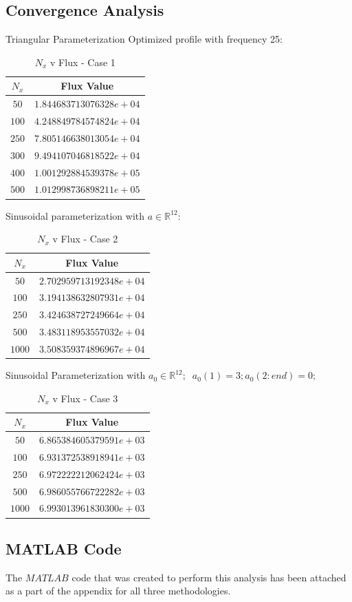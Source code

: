 \documentclass{article}
\begin{document}
\begin{appendix}
\subsection{Convergence Analysis}
Triangular Parameterization Optimized profile with frequency 25:\\ 
\begin{table}[H]
\centering
\begin{tabular}{|c|c|}
\hline
$N_x$ & Flux Value \\
\hline
$50$ & $1.844683713076328e+04$\\
$100$ & $4.248849784574824e+04$ \\
$250$ & $7.805146638013054e+04$\\
$300$ & $9.494107046818522e+04$\\ 
$400$ & $1.001292884539378e+05$\\
$500$ & $1.012998736898211e+05$\\
\hline
\end{tabular}
\caption{$N_x$ v Flux - Case 1}
\end{table} 

Sinusoidal parameterization with $a \in \mathbb{R}^{12}$: \\
\begin{table}[H]
\centering
\begin{tabular}{|c|c|}
\hline
$N_x$ & Flux Value \\
\hline
$50$ & $2.702959713192348e+04$\\
$100$ & $3.194138632807931e+04$ \\
$250$ & $3.424638727249664e+04$\\
$500$ & $3.483118953557032e+04$\\ 
$1000$ & $3.508359374896967e+04$\\
\hline
\end{tabular} 
\caption{$N_x$ v Flux - Case 2}
\end{table} 

Sinusoidal Parameterization with $ a_0 \in \mathbb{R}^{12}; \; \; a_0(1) = 3; a_0(2:end) = 0;$ \\ 
\begin{table}[H]
\centering
\begin{tabular}{|c|c|}
\hline
$N_x$ & Flux Value \\
\hline
$50$ & $6.865384605379591e+03$\\
$100$ & $6.931372538918941e+03$ \\
$250$ & $6.972222212062424e+03$\\
$500$ & $6.986055766722282e+03$\\ 
$1000$ & $6.993013961830300e+03$\\
\hline
\end{tabular} 
\caption{$N_x$ v Flux - Case 3}
\end{table}
\subsection{MATLAB Code}
The $MATLAB$ code that was created to perform this analysis has been attached as a part of the appendix for all three methodologies. 
\end{appendix}
\end{document}
